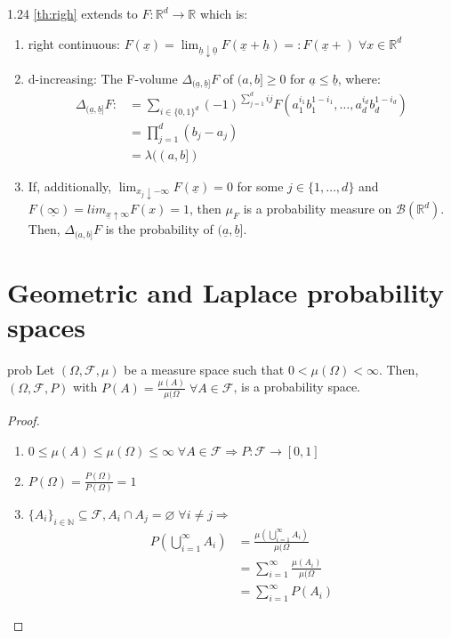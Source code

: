 \documentclass{article}
\begin{document}
	\begin{myrem}{}{1.24}
		\ref{th:righ} extends to $F : \mathbb{R}^d\to\mathbb{R}$ which is:
		\begin{enumerate}[label=(\roman*)]
			\item right continuous: $F(\underline{x})=\lim_{\underline{h}\downarrow\underline{0}}F(\underline{x}+\underline{h})=:F(\underline{x}+)\;\forall x\in\mathbb{R}^d$
			\item d-increasing: The F-volume $\Delta_{(\underline{a}, \underline{b}]}F$ of $(a, b]\geq0$ for $\underline{a}\leq\underline{b}$, where:
			\begin{align*}
				\Delta_{(\underline{a}, \underline{b}]}F:&=\sum_{i\in\{0, 1\}^d}(-1)^{\sum_{j=1}^{d}ij}F(a_1^{i_1}b_1^{1-i_1}, \dots, a_d^{i_d}b_d^{1-i_d})\\
				&=\prod_{j=1}^{d}(b_j-a_j)\\
				&=\lambda((a, b])
			\end{align*}
			\item If, additionally, $\lim_{x_j\downarrow-\infty}F(\underline{x})=0$ for some $j\in\{1, \dots, d\}$ and $F(\underline{\infty})=lim_{\underline{x}\uparrow\infty}F(x)=1$, then $\mu_F$ is a probability measure on $\mathcal{B}(\mathbb{R}^d)$. Then, $\Delta_{(a, b]}F$ is the probability of $(\underline{a}, \underline{b}]$.
		\end{enumerate}
	\end{myrem}
	
	\newpage
	\section{Geometric and Laplace probability spaces}
	
	\begin{myprop}{}{prob}
		Let $(\Omega, \mathcal{F}, \mu)$ be a measure space such that $0<\mu(\Omega)<\infty$. Then, $(\Omega, \mathcal{F}, P)$ with $P(A)=\frac{\mu(A)}{\mu(\Omega}\;\forall A\in\mathcal{F}$, is a probability space. 
		
		\begin{proof}~\\
			\begin{enumerate}[label=(\roman*)]
				\item $0\leq\mu(A)\leq\mu(\Omega)\leq\infty\;\forall A\in\mathcal{F}\Rightarrow P : \mathcal{F}\to[0, 1]$
				\item $P(\Omega)=\frac{P(\Omega)}{P(\Omega)}=1$
				\item $\{A_i\}_{i\in\mathbb{N}}\subseteq\mathcal{F}, A_i\cap A_j=\varnothing\;\forall i\neq j\Rightarrow$
				\begin{align*}
					P(\bigcup_{i=1}^{\infty}A_i)&=\frac{\mu(\bigcup_{i=1}^{\infty}A_i)}{\mu(\Omega}\\
					&=\sum_{i=1}^{\infty}\frac{\mu(A_i)}{\mu(\Omega}\\
					&=\sum_{i=1}^{\infty}P(A_i)
				\end{align*}
			\end{enumerate}
		\end{proof}
	\end{myprop}
	
\end{document}
